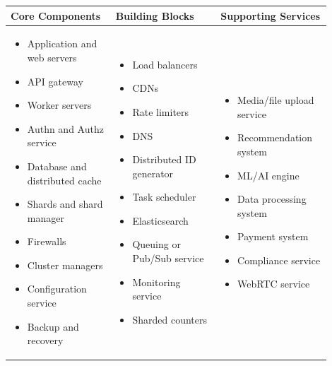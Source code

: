 \begin{center}
\begin{tabular}{|p{0.30\linewidth}|p{0.30\linewidth}|p{0.30\linewidth}|}
\hline
\textbf{Core Components} & \textbf{Building Blocks} & \textbf{Supporting Services} \\
\hline
\begin{itemize}
    \item Application and web servers
    \item API gateway
    \item Worker servers
    \item Authn and Authz service
    \item Database and distributed cache
    \item Shards and shard manager
    \item Firewalls
    \item Cluster managers
    \item Configuration service
    \item Backup and recovery
\end{itemize}
&
\begin{itemize}
    \item Load balancers
    \item CDNs
    \item Rate limiters
    \item DNS
    \item Distributed ID generator
    \item Task scheduler
    \item Elasticsearch
    \item Queuing or Pub/Sub service
    \item Monitoring service
    \item Sharded counters
\end{itemize}
&
\begin{itemize}
    \item Media/file upload service
    \item Recommendation system
    \item ML/AI engine
    \item Data processing system
    \item Payment system
    \item Compliance service
    \item WebRTC service
\end{itemize} \\
\hline
\end{tabular}
\end{center}


